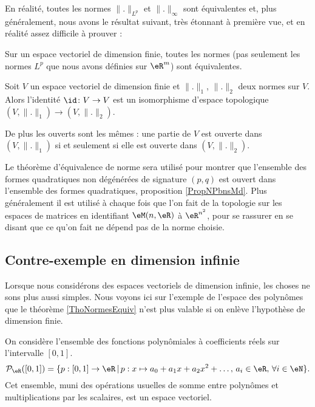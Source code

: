 En réalité, toutes les normes \( \| . \|_{L^p}\) et \( \| . \|_{\infty}\) sont équivalentes et, plus généralement, nous avons le résultat suivant, très étonnant à première vue, et en réalité assez difficile à prouver :
\begin{theorem}		\label{ThoNormesEquiv}
	Sur un espace vectoriel de dimension finie, toutes les normes (pas seulement les normes $L^p$ que nous avons définies sur $\eR^m$) sont équivalentes.
\end{theorem}

\begin{corollary}
    Soit \( V\) un espace vectoriel de dimension finie et \( \| . \|_1\), \( \| . \|_2\) deux normes sur \( V\). Alors l'identité \( \id\colon V\to V\) est un isomorphisme d'espace topologique \( (V,\| . \|_1)\to (V,\| . \|_2)\).

    De plus les ouverts sont les mêmes : une partie de \( V\) est ouverte dans \( (V,\| . \|_1)\) si et seulement si elle est ouverte dans \( (V,\| . \|_2)\).
\end{corollary}

Le théorème d'équivalence de norme sera utilisé pour montrer que l'ensemble des formes quadratiques non dégénérées de signature \( (p,q)\) est ouvert dans l'ensemble des formes quadratiques, proposition \ref{PropNPbnsMd}. Plus généralement il est utilisé à chaque fois que l'on fait de la topologie sur les espaces de matrices en identifiant \( \eM(n,\eR)\) à \( \eR^{n^2}\), pour se rassurer en se disant que ce qu'on fait ne dépend pas de la norme choisie.

\subsection{Contre-exemple en dimension infinie}
\label{SubSecPOlynomesCE}

Lorsque nous considérons des espaces vectoriels de dimension infinie, les choses ne sons plus aussi simples. Nous voyons ici sur l'exemple de l'espace des polynômes que le théorème \ref{ThoNormesEquiv} n'est plus valable si on enlève l'hypothèse de dimension finie.

On considère l'ensemble des fonctions polynômiales à coefficients réels sur  l'intervalle $[0,1]$.
\begin{equation}
\mathcal{P}_\eR([0,1])=\{p:[0,1]\to \eR\,|\, p : x\mapsto a_0+a_1 x +a_2 x^2 + \ldots, \, a_i\in\eR,\,\forall i\in \eN\}.
\end{equation}
Cet ensemble, muni des opérations usuelles de somme entre polynômes et multiplications par les scalaires, est un espace vectoriel.  

